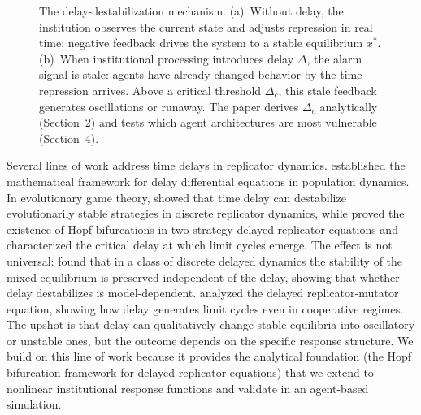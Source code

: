 \begin{figure}[t]
\caption{The delay-destabilization mechanism. (a)~Without delay, the institution observes the current state and adjusts repression in real time; negative feedback drives the system to a stable equilibrium $x^*$. (b)~When institutional processing introduces delay $\Delta$, the alarm signal is stale: agents have already changed behavior by the time repression arrives. Above a critical threshold $\Delta_c$, this stale feedback generates oscillations or runaway. The paper derives $\Delta_c$ analytically (Section~2) and tests which agent architectures are most vulnerable (Section~4).}
\label{fig:mechanism}
\end{figure}

Several lines of work address time delays in replicator dynamics. \citet{kuang1993delay} established the mathematical framework for delay differential equations in population dynamics. In evolutionary game theory, \citet{alboszta2004stability} showed that time delay can destabilize evolutionarily stable strategies in discrete replicator dynamics, while \citet{wesson2016hopf} proved the existence of Hopf bifurcations in two-strategy delayed replicator equations and characterized the critical delay at which limit cycles emerge. The effect is not universal: \citet{iijima2012delayed} found that in a class of discrete delayed dynamics the stability of the mixed equilibrium is preserved independent of the delay, showing that whether delay destabilizes is model-dependent. \citet{mittal2020delayed} analyzed the delayed replicator-mutator equation, showing how delay generates limit cycles even in cooperative regimes. The upshot is that delay can qualitatively change stable equilibria into oscillatory or unstable ones, but the outcome depends on the specific response structure. We build on this line of work because it provides the analytical foundation (the Hopf bifurcation framework for delayed replicator equations) that we extend to nonlinear institutional response functions and validate in an agent-based simulation.

